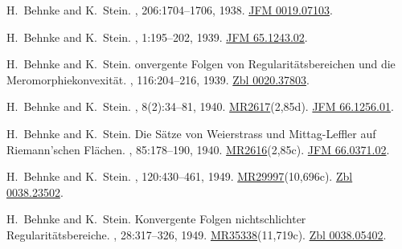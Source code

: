 \documentclass[11pt,a4paper, final, twoside]{article}
\numberwithin{equation}{section}
\begin{document}
\begin{appendices}
\begin{thebibliography}{100}
H.~Behnke and K.~Stein.
, 206:1704--1706, 1938.
\newblock \href{http://zbmath.org/?q=an:0019.07103}{JFM 0019.07103}.

H.~Behnke and K.~Stein.
, 1:195--202, 1939.
\newblock \href{http://zbmath.org/?q=an:65.1243.02}{JFM 65.1243.02}.

H.~Behnke and K.~Stein.
onvergente {F}olgen von {R}egularit\"atsbereichen und die
  {M}eromorphiekonvexit\"at.
, 116:204--216, 1939.
\newblock \href{https://zbmath.org/?q=an:0020.37803}{Zbl 0020.37803}.

H.~Behnke and K.~Stein.
,
  8(2):34--81, 1940.
\newblock \href{http://www.ams.org/mathscinet-getitem?mr=2617}{MR2617}(2,85d).
  \href{http://zbmath.org/?q=an:66.1256.01}{JFM 66.1256.01}.

H.~Behnke and K.~Stein.
\newblock Die {S}\"atze von {W}eierstrass und {M}ittag-{L}effler auf
  {R}iemann'schen {F}l\"achen.
, 85:178--190, 1940.
\newblock \href{http://www.ams.org/mathscinet-getitem?mr=2616}{MR2616}(2,85c).
  \href{http://zbmath.org/?q=an:66.0371.02}{JFM 66.0371.02}.

H.~Behnke and K.~Stein.
, 120:430--461, 1949.
\newblock
  \href{http://www.ams.org/mathscinet-getitem?mr=29997}{MR29997}(10,696c).
  \href{http://zbmath.org/?q=an:0038.23502}{Zbl 0038.23502}.

H.~Behnke and K.~Stein.
\newblock Konvergente {F}olgen nichtschlichter {R}egularit\"atsbereiche.
, 28:317--326, 1949.
\newblock
  \href{http://www.ams.org/mathscinet-getitem?mr=35338}{MR35338}(11,719c).
  \href{http://zbmath.org/?q=an:0038.05402}{Zbl 0038.05402}.


\end{thebibliography}
\end{appendices}
\end{document}
